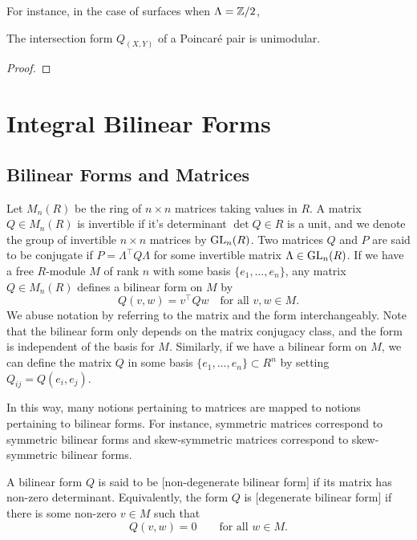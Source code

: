 For instance, in the case of surfaces when $\Lambda=\mathbb{Z}/2$, 

\begin{proposition}
	The intersection form $Q_{(X,Y)}$ of a Poincar\'e pair is unimodular.
\end{proposition}
\begin{proof}
	
\end{proof}

\section{Integral Bilinear Forms}

\subsection*{Bilinear Forms and Matrices}

Let $M_n(R)$ be the ring of $n\times n$ matrices taking values in $R$. A matrix $Q\in M_n(R)$ is invertible if it's determinant $\det Q\in R$ is a unit, and we denote the group of invertible $n\times n$ matrices by ${\operatorname{GL}}_n(R)$. Two matrices $Q$ and $P$ are said to be conjugate if $P = \Lambda^\intercal Q\Lambda$ for some invertible matrix $\Lambda\in {\operatorname{GL}}_n(R)$. If we have a free $R$-module $M$ of rank $n$ with some basis $\{e_1,\ldots, e_n\}$, any matrix $Q\in M_n(R)$ defines a bilinear form on $M$ by
\[
	Q(v,w) = v^\intercal Q w\quad \textrm{for all }v,w\in M.
\]
We abuse notation by referring to the matrix and the form interchangeably.
Note that the bilinear form only depends on the matrix conjugacy class, and the form is independent of the basis for $M$.
Similarly, if we have a bilinear form on $M$, we can define the matrix $Q$ in some basis $\{e_1,\ldots, e_n\}\subset R^n$ by setting $Q_{ij}= Q(e_i, e_j)$.

In this way, many notions pertaining to matrices are mapped to notions pertaining to bilinear forms. For instance, symmetric matrices correspond to symmetric bilinear forms and skew-symmetric matrices correspond to skew-symmetric bilinear forms.

\begin{definition}
	A bilinear form $Q$ is said to be [non-degenerate bilinear form] if its matrix has non-zero determinant. Equivalently, the form $Q$ is [degenerate bilinear form] if there is some non-zero $v\in M$ such that
	\[Q(v,w)=0 \quad\quad \textrm{for all }w\in M.\]
\end{definition}


